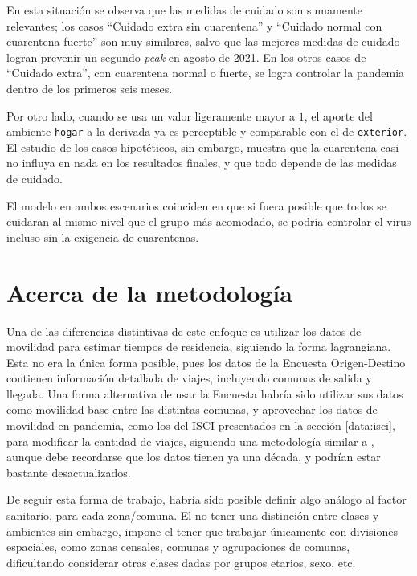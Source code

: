 En esta situación se observa que las medidas de cuidado son sumamente relevantes; los casos ``Cuidado extra sin cuarentena'' y ``Cuidado normal con cuarentena fuerte'' son muy similares, salvo que las mejores medidas de cuidado logran prevenir un segundo \textit{peak} en agosto de 2021. En los otros casos de ``Cuidado extra'', con cuarentena normal o fuerte, se logra controlar la pandemia dentro de los primeros seis meses.

Por otro lado, cuando se usa un valor ligeramente mayor a \(1\), el aporte del ambiente \texttt{hogar} a la derivada ya es perceptible y comparable con el de \texttt{exterior}. El estudio de los casos hipotéticos, sin embargo, muestra que la cuarentena casi no influya en nada en los resultados finales, y que todo depende de las medidas de cuidado. 

El modelo en ambos escenarios coinciden en que si fuera posible que todos se cuidaran al mismo nivel que el grupo más acomodado, se podría controlar el virus incluso sin la exigencia de cuarentenas.

\section{Acerca de la metodología}\label{dis:metod}



Una de las diferencias distintivas de este enfoque es utilizar los datos de movilidad para estimar tiempos de residencia, siguiendo la forma lagrangiana. Esta no era la única forma posible, pues los datos de la Encuesta Origen-Destino contienen información detallada de viajes, incluyendo comunas de salida y llegada. Una forma alternativa de usar la Encuesta habría sido utilizar sus datos como movilidad base entre las distintas comunas, y aprovechar los datos de movilidad en pandemia, como los del ISCI presentados en la sección \ref{data:isci}, para modificar la cantidad de viajes, siguiendo una metodología similar a \cite{Lai2020}, aunque debe recordarse que los datos tienen ya una década, y podrían estar bastante desactualizados.

De seguir esta forma de trabajo, habría sido posible definir algo análogo al factor sanitario, para cada zona/comuna. El no tener una distinción entre clases y ambientes sin embargo, impone el tener que trabajar únicamente con divisiones espaciales, como zonas censales, comunas y agrupaciones de comunas, dificultando considerar otras clases dadas por grupos etarios, sexo, etc.


